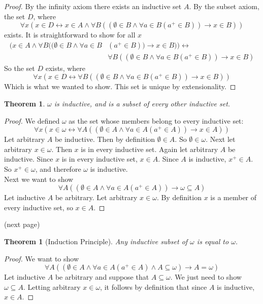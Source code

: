 \documentclass{report}
\newtheorem{theorem}[theo]{Theorem}
\begin{document}
\begin{proof}
By the infinity axiom there exists an inductive set $A$. By the subset axiom, the set $D$, where
\begin{equation*}
\forall x(x\in D\leftrightarrow x\in A\land\forall B((\emptyset\in B\land\forall a\in B(a^+\in B))\to x\in B))
\end{equation*}
exists. It is straightforward to show for all $x$
\begin{align*}
(x\in A\land\forall B((\emptyset\in B\land\forall a\in B&(a^+\in B))\to x\in B))\leftrightarrow\\
&\forall B((\emptyset\in B\land\forall a\in B(a^+\in B))\to x\in B)
\end{align*}
So the set $D$ exists, where
\begin{equation*}
\forall x(x\in D\leftrightarrow\forall B((\emptyset\in B\land\forall a\in B(a^+\in B))\to x\in B))
\end{equation*}
Which is what we wanted to show. This set is unique by extensionality.
\end{proof}
\begin{theorem}
$\omega$ is inductive, and is a subset of every other inductive set.
\end{theorem}
\begin{proof}
We defined $\omega$ as the set whose members belong to every inductive set:
\begin{equation*}
\forall x(x\in\omega\leftrightarrow\forall A((\emptyset\in A\land\forall a\in A(a^+\in A))\to x\in A))
\end{equation*}
Let arbitrary $A$ be inductive. Then by definition $\emptyset\in A$.
So $\emptyset\in\omega$. Next let arbitrary $x\in\omega$.
Then $x$ is in every inductive set. Again let arbitrary $A$ be inductive. Since $x$ is in every inductive set, $x\in A$. Since $A$ is
inductive, $x^+\in A$. So $x^+\in\omega$, and therefore $\omega$ is inductive.\\
\indent Next we want to show
\begin{equation*}
\forall A((\emptyset\in A\land\forall a\in A(a^+\in A))\to\omega\subseteq A)
\end{equation*}
Let inductive $A$ be arbitrary. Let arbitrary $x\in\omega$. By definition $x$ is a member of every inductive 
set, so $x\in A$.
\end{proof}
\noindent(next page)\newpage
\begin{theorem}[Induction Principle]
Any inductive subset of $\omega$ is equal to $\omega$.
\end{theorem}
\begin{proof}
We want to show
\begin{equation*}
\forall A((\emptyset\in A\land\forall a\in A(a^+\in A)\land A\subseteq\omega)\to A=\omega)
\end{equation*}
Let inductive $A$ be arbitrary and suppose that $A\subseteq\omega$. We just need to show
$\omega\subseteq A$. Letting arbitrary $x\in\omega$, it follows by definition that since $A$ is inductive, $x\in A$.
\end{proof}
\end{document}
